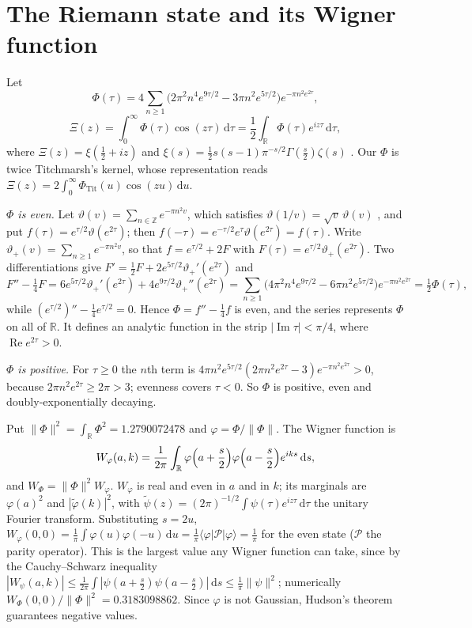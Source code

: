 \documentclass[11pt]{article}
\theoremstyle{definition}\newtheorem{definition}[theorem]{Definition}
\theoremstyle{remark}\newtheorem{remark}[theorem]{Remark}
\newcommand{\R}{\mathbb R}\newcommand{\C}{\mathbb C}\newcommand{\N}{\mathbb N}
\newcommand{\dd}{\,\mathrm d}\newcommand{\e}{\mathrm e}
\renewcommand{\Re}{\operatorname{Re}}\renewcommand{\Im}{\operatorname{Im}}
\begin{document}
\section{The Riemann state and its Wigner function}\label{sec:state}
Let
\[
\Phi(\tau)=4\sum_{n\ge1}\bigl(2\pi^2n^4e^{9\tau/2}-3\pi n^2e^{5\tau/2}\bigr)e^{-\pi n^2e^{2\tau}},
\]
\[
\Xi(z)=\int_0^\infty\Phi(\tau)\cos(z\tau)\dd\tau=\frac12\int_\R\Phi(\tau)e^{iz\tau}\dd\tau,
\]
where $\Xi(z)=\xi(\frac12+iz)$ and $\xi(s)=\frac12s(s-1)\pi^{-s/2}\Gamma(\frac s2)\zeta(s)$ \cite[Ch.~2 and \S2.16]{Titchmarsh}. Our $\Phi$ is twice Titchmarsh's kernel, whose representation reads $\Xi(z)=2\int_0^\infty\Phi_{\mathrm{Tit}}(u)\cos(zu)\dd u$.

\emph{$\Phi$ is even.} Let $\vartheta(v)=\sum_{n\in\mathbb Z}e^{-\pi n^2v}$, which satisfies $\vartheta(1/v)=\sqrt v\,\vartheta(v)$ \cite[\S2.6]{Titchmarsh}, and put $f(\tau)=e^{\tau/2}\vartheta(e^{2\tau})$; then $f(-\tau)=e^{-\tau/2}e^{\tau}\vartheta(e^{2\tau})=f(\tau)$. Write $\vartheta_+(v)=\sum_{n\ge1}e^{-\pi n^2v}$, so that $f=e^{\tau/2}+2F$ with $F(\tau)=e^{\tau/2}\vartheta_+(e^{2\tau})$. Two differentiations give $F'=\frac12F+2e^{5\tau/2}\vartheta_+'(e^{2\tau})$ and
\[
F''-\tfrac14F=6e^{5\tau/2}\vartheta_+'(e^{2\tau})+4e^{9\tau/2}\vartheta_+''(e^{2\tau})=\sum_{n\ge1}\bigl(4\pi^2n^4e^{9\tau/2}-6\pi n^2e^{5\tau/2}\bigr)e^{-\pi n^2e^{2\tau}}=\tfrac12\Phi(\tau),
\]
while $(e^{\tau/2})''-\frac14e^{\tau/2}=0$. Hence $\Phi=f''-\frac14f$ is even, and the series represents $\Phi$ on all of $\R$. It defines an analytic function in the strip $|\Im\tau|<\pi/4$, where $\Re e^{2\tau}>0$.

\emph{$\Phi$ is positive.} For $\tau\ge0$ the $n$th term is $4\pi n^2e^{5\tau/2}(2\pi n^2e^{2\tau}-3)e^{-\pi n^2e^{2\tau}}>0$, because $2\pi n^2e^{2\tau}\ge2\pi>3$; evenness covers $\tau<0$. So $\Phi$ is positive, even and doubly-exponentially decaying.

Put $\|\Phi\|^2=\int_\R\Phi^2=1.2790072478$ and $\varphi=\Phi/\|\Phi\|$. The Wigner function is
\[
W_\varphi(a,k)=\frac1{2\pi}\int_\R\varphi\Bigl(a+\frac s2\Bigr)\varphi\Bigl(a-\frac s2\Bigr)e^{iks}\dd s,
\]
and $W_\Phi=\|\Phi\|^2W_\varphi$. $W_\varphi$ is real and even in $a$ and in $k$; its marginals are $\varphi(a)^2$ and $|\tilde\varphi(k)|^2$, with $\tilde\psi(z)=(2\pi)^{-1/2}\int\psi(\tau)e^{iz\tau}\dd\tau$ the unitary Fourier transform. Substituting $s=2u$, $W_\varphi(0,0)=\frac1\pi\int\varphi(u)\varphi(-u)\dd u=\frac1\pi\langle\varphi|\mathcal P|\varphi\rangle=\frac1\pi$ for the even state ($\mathcal P$ the parity operator). This is the largest value any Wigner function can take, since by the Cauchy--Schwarz inequality $|W_\psi(a,k)|\le\frac1{2\pi}\int|\psi(a+\frac s2)\psi(a-\frac s2)|\dd s\le\frac1\pi\|\psi\|^2$; numerically $W_\Phi(0,0)/\|\Phi\|^2=0.3183098862$. Since $\varphi$ is not Gaussian, Hudson's theorem \cite{Hudson} guarantees negative values.
\end{document}
